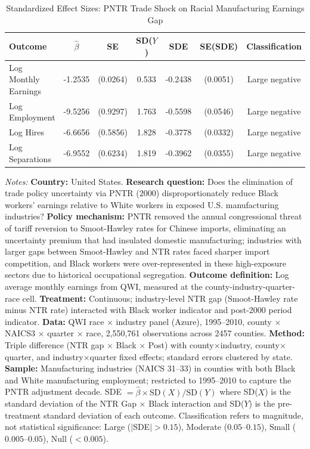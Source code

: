\begin{table}[htbp]
\centering
\caption{Standardized Effect Sizes: PNTR Trade Shock on Racial Manufacturing Earnings Gap}
\label{tab:sde}
\small
\begin{tabular}{lcccccc}
\toprule
Outcome & $\hat{\beta}$ & SE & SD($Y$) & SDE & SE(SDE) & Classification \\
\midrule
Log Monthly Earnings & -1.2535 & (0.0264) & 0.533 & -0.2438 & (0.0051) & Large negative \\
Log Employment & -9.5256 & (0.9297) & 1.763 & -0.5598 & (0.0546) & Large negative \\
Log Hires & -6.6656 & (0.5856) & 1.828 & -0.3778 & (0.0332) & Large negative \\
Log Separations & -6.9552 & (0.6234) & 1.819 & -0.3962 & (0.0355) & Large negative \\
\bottomrule
\end{tabular}
\begin{tablenotes}
\item \textit{Notes:} \textbf{Country:} United States. \textbf{Research question:} Does the elimination of trade policy uncertainty via PNTR (2000) disproportionately reduce Black workers' earnings relative to White workers in exposed U.S. manufacturing industries? \textbf{Policy mechanism:} PNTR removed the annual congressional threat of tariff reversion to Smoot-Hawley rates for Chinese imports, eliminating an uncertainty premium that had insulated domestic manufacturing; industries with larger gaps between Smoot-Hawley and NTR rates faced sharper import competition, and Black workers were over-represented in these high-exposure sectors due to historical occupational segregation. \textbf{Outcome definition:} Log average monthly earnings from QWI, measured at the county-industry-quarter-race cell. \textbf{Treatment:} Continuous; industry-level NTR gap (Smoot-Hawley rate minus NTR rate) interacted with Black worker indicator and post-2000 period indicator. \textbf{Data:} QWI race $\times$ industry panel (Azure), 1995--2010, county $\times$ NAICS3 $\times$ quarter $\times$ race, 2,550,761 observations across 2457 counties. \textbf{Method:} Triple difference (NTR gap $\times$ Black $\times$ Post) with county$\times$industry, county$\times$quarter, and industry$\times$quarter fixed effects; standard errors clustered by state. \textbf{Sample:} Manufacturing industries (NAICS 31--33) in counties with both Black and White manufacturing employment; restricted to 1995--2010 to capture the PNTR adjustment decade. SDE $= \hat{\beta} \times \text{SD}(X) / \text{SD}(Y)$ where SD($X$) is the standard deviation of the NTR Gap $\times$ Black interaction and SD($Y$) is the pre-treatment standard deviation of each outcome. Classification refers to magnitude, not statistical significance: Large ($|$SDE$| > 0.15$), Moderate ($0.05$--$0.15$), Small ($0.005$--$0.05$), Null ($< 0.005$).
\end{tablenotes}
\end{table}
